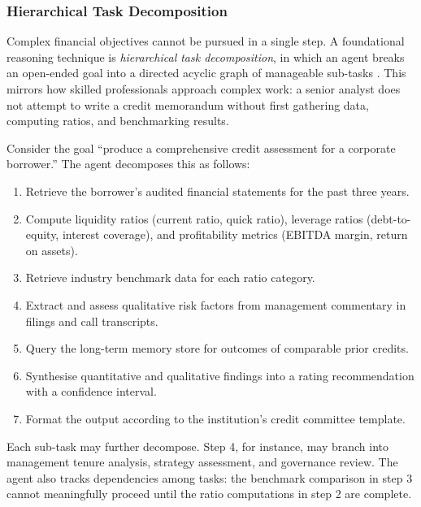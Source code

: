 \documentclass{article}
\begin{document}

\subsubsection{Hierarchical Task Decomposition}

Complex financial objectives cannot be pursued in a single step. A foundational
reasoning technique is \textit{hierarchical task decomposition}, in which an
agent breaks an open-ended goal into a directed acyclic graph of manageable
sub-tasks \cite{yao2023tree}. This mirrors how skilled professionals approach
complex work: a senior analyst does not attempt to write a credit memorandum
without first gathering data, computing ratios, and benchmarking results.

Consider the goal ``produce a comprehensive credit assessment for a corporate
borrower.'' The agent decomposes this as follows:

\begin{enumerate}
  \item Retrieve the borrower's audited financial statements for the past three
        years.
  \item Compute liquidity ratios (current ratio, quick ratio), leverage ratios
        (debt-to-equity, interest coverage), and profitability metrics
        (EBITDA margin, return on assets).
  \item Retrieve industry benchmark data for each ratio category.
  \item Extract and assess qualitative risk factors from management commentary
        in filings and call transcripts.
  \item Query the long-term memory store for outcomes of comparable prior
        credits.
  \item Synthesise quantitative and qualitative findings into a rating
        recommendation with a confidence interval.
  \item Format the output according to the institution's credit committee
        template.
\end{enumerate}

Each sub-task may further decompose. Step 4, for instance, may branch into
management tenure analysis, strategy assessment, and governance review. The
agent also tracks dependencies among tasks: the benchmark comparison in step 3
cannot meaningfully proceed until the ratio computations in step 2 are
complete.

\end{document}
